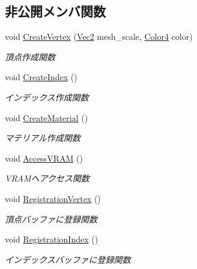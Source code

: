 \subsection*{非公開メンバ関数}
\begin{DoxyCompactItemize}
\item 
void \mbox{\hyperlink{class_plane_polygon_a4636b29e9f115e00b16a52089508fb2e}{Create\+Vertex}} (\mbox{\hyperlink{_vector3_d_8h_a5ef6e95dfc5f9d3820b71772d99bbc25}{Vec2}} mesh\+\_\+scale, \mbox{\hyperlink{_vector3_d_8h_a9c2339f516cf07ce4753b8a99fab3791}{Color4}} color)
\begin{DoxyCompactList}\small\item\em 頂点作成関数 \end{DoxyCompactList}\item 
void \mbox{\hyperlink{class_plane_polygon_a55840ace8bfa216c37f94e963b3fa5e3}{Create\+Index}} ()
\begin{DoxyCompactList}\small\item\em インデックス作成関数 \end{DoxyCompactList}\item 
void \mbox{\hyperlink{class_plane_polygon_a4539899c78a222ddc651e45943a7f55b}{Create\+Material}} ()
\begin{DoxyCompactList}\small\item\em マテリアル作成関数 \end{DoxyCompactList}\item 
void \mbox{\hyperlink{class_plane_polygon_a88e476aa4b627d7242dc4f1b5eccf889}{Access\+V\+R\+AM}} ()
\begin{DoxyCompactList}\small\item\em V\+R\+A\+Mへアクセス関数 \end{DoxyCompactList}\item 
void \mbox{\hyperlink{class_plane_polygon_af4ba95cfaf0aba506eeb58cdc80bfd46}{Registration\+Vertex}} ()
\begin{DoxyCompactList}\small\item\em 頂点バッファに登録関数 \end{DoxyCompactList}\item 
void \mbox{\hyperlink{class_plane_polygon_a535d0222908f4a4a030d8b525b225554}{Registration\+Index}} ()
\begin{DoxyCompactList}\small\item\em インデックスバッファに登録関数 \end{DoxyCompactList}\end{DoxyCompactItemize}
